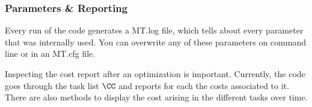 \documentclass[10pt,fleqn,twoside]{article}
\begin{document}
{{\subsubsection{Parameters \& Reporting}

Every run of the code generates a MT.log file, which tells about every
parameter that was internally used. You can overwrite any of these
parameters on command line or in an MT.cfg file.

Inspecting the cost report after an optimization is
important. Currently, the code goes through the task list $\CC$ and
reports for each the costs associated to it. There are also methods to
display the cost arising in the different tasks over time.











}}
\end{document}
